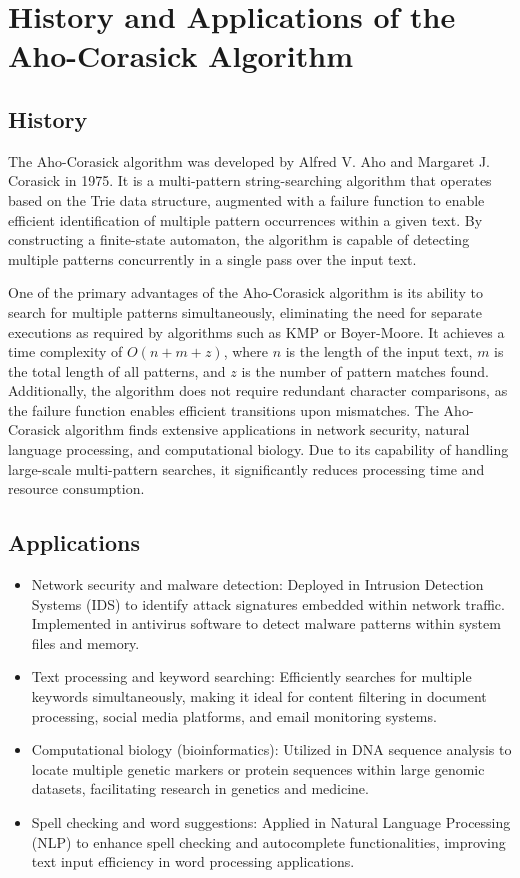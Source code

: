 
\section{History and Applications of the Aho-Corasick Algorithm}
\subsection{History}
The Aho-Corasick algorithm was developed by Alfred V. Aho and Margaret J. Corasick in 1975. It is a multi-pattern string-searching algorithm that operates based on the Trie data structure, augmented with a failure function to enable efficient identification of multiple pattern occurrences within a given text. By constructing a finite-state automaton, the algorithm is capable of detecting multiple patterns concurrently in a single pass over the input text.

One of the primary advantages of the Aho-Corasick algorithm is its ability to search for multiple patterns simultaneously, eliminating the need for separate executions as required by algorithms such as KMP or Boyer-Moore. It achieves a time complexity of $O(n+m+z)$, where $n$ is the length of the input text, $m$ is the total length of all patterns, and $z$ is the number of pattern matches found. Additionally, the algorithm does not require redundant character comparisons, as the failure function enables efficient transitions upon mismatches. The Aho-Corasick algorithm finds extensive applications in network security, natural language processing, and computational biology. Due to its capability of handling large-scale multi-pattern searches, it significantly reduces processing time and resource consumption.

\subsection{Applications}
\begin{itemize}
    \item Network security and malware detection: Deployed in Intrusion Detection Systems (IDS) to identify attack signatures embedded within network traffic. Implemented in antivirus software to detect malware patterns within system files and memory.
    \item Text processing and keyword searching: Efficiently searches for multiple keywords simultaneously, making it ideal for content filtering in document processing, social media platforms, and email monitoring systems.
    \item Computational biology (bioinformatics): Utilized in DNA sequence analysis to locate multiple genetic markers or protein sequences within large genomic datasets, facilitating research in genetics and medicine.
    \item Spell checking and word suggestions: Applied in Natural Language Processing (NLP) to enhance spell checking and autocomplete functionalities, improving text input efficiency in word processing applications.
\end{itemize}

